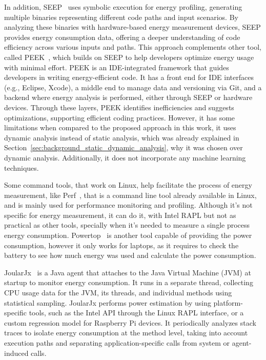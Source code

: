In addition, SEEP~\cite{10.1145/2094091.2094106} uses symbolic execution for energy profiling, generating multiple binaries representing different code paths and input scenarios. By analyzing these binaries with hardware-based energy measurement devices, SEEP provides energy consumption data, offering a deeper understanding of code efficiency across various inputs and paths. This approach complements other tool, called PEEK~\cite{187026}, which builds on SEEP to help developers optimize energy usage with minimal effort. PEEK is an IDE-integrated framework that guides developers in writing energy-efficient code. It has a front end for IDE interfaces (e.g., Eclipse, Xcode), a middle end to manage data and versioning via Git, and a backend where energy analysis is performed, either through SEEP or hardware devices. Through these layers, PEEK identifies inefficiencies and suggests optimizations, supporting efficient coding practices. However, it has some limitations when compared to the proposed approach in this work, it uses dynamic analysis instead of static analysis, which was already explained in Section~\ref{sec:background_static_dynamic_analysis}, why it was chosen over dynamic analysis. Additionally, it does not incorporate any machine learning techniques.

Some command tools, that work on Linux, help facilitate the process of energy measurement, like Perf~\cite{perfwiki_main}, that is a command line tool already available in Linux, and is mainly used for performance monitoring and profiling. Although it's not specific for energy measurement, it can do it, with Intel RAPL but not as practical as other tools, specially when it's needed to measure a single process energy consumption. Powertop~\cite{archlinux_Powertop} is another tool capable of providing the power consumption, however it only works for laptops, as it requires to check the battery to see how much energy was used and calculate the power consumption.

JoularJx~\cite{noureddine-ie-2022} is a Java agent that attaches to the Java Virtual Machine (JVM) at startup to monitor energy consumption. It runs in a separate thread, collecting CPU usage data for the JVM, its threads, and individual methods using statistical sampling. JoularJx performs power estimation by using platform-specific tools, such as the Intel API through the Linux RAPL interface, or a custom regression model for Raspberry Pi devices. It periodically analyzes stack traces to isolate energy consumption at the method level, taking into account execution paths and separating application-specific calls from system or agent-induced calls.

